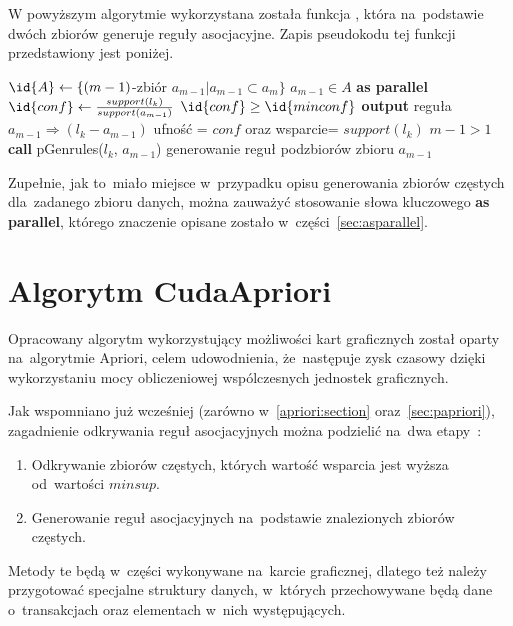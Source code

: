 W powyższym algorytmie wykorzystana została funkcja , która na~podstawie dwóch zbiorów generuje reguły asocjacyjne. Zapis pseudokodu tej funkcji przedstawiony jest poniżej.

\begin{codebox}
		\li $\id{A} \gets \lbrace (m-1)$-zbiór $a_{m-1} | a_{m-1} \subset a_m \rbrace$
		\li \For $a_{m-1} \in A$ \textbf{as parallel}
			\li \Do
			$\id{conf} \gets \frac{support(l_k)}{support(a_{m-1})}$
			\li \If $\id{conf} \geq \id{minconf}$
				\li \Then
						\textbf{output} reguła $a_{m-1} \Rightarrow (l_k - a_{m-1})$ \CommentSymbol ufność = $conf$ oraz wsparcie= $support(l_k)$
						\li \If $m-1 > 1$ 
							\li \Then
							\textbf{call} pGenrules($l_k$, $a_{m-1}$) \CommentSymbol generowanie reguł podzbiorów zbioru $a_{m-1}$
						\End
				\End
			\End
		\End
\end{codebox}

Zupełnie, jak to~miało miejsce w~przypadku opisu generowania zbiorów częstych dla~zadanego zbioru danych, można zauważyć stosowanie słowa kluczowego \textbf{as parallel}, którego znaczenie opisane zostało w~części~\ref{sec:asparallel}.

\section{Algorytm CudaApriori\label{sec:capriori}}

Opracowany algorytm wykorzystujący możliwości kart graficznych został oparty na~algorytmie Apriori, celem udowodnienia, że~następuje zysk czasowy dzięki wykorzystaniu mocy obliczeniowej wspólczesnych jednostek graficznych.

Jak wspomniano już wcześniej (zarówno w~\ref{apriori:section} oraz~\ref{sec:papriori}), zagadnienie odkrywania reguł asocjacyjnych można podzielić na~dwa etapy~\cite{Problem:Statement}:
\begin{enumerate}
	\item Odkrywanie zbiorów częstych, których wartość wsparcia jest wyższa od~wartości $minsup$.
	\item Generowanie reguł asocjacyjnych na~podstawie znalezionych zbiorów częstych.
\end{enumerate}

Metody te będą w~części wykonywane na~karcie graficznej, dlatego też należy przygotować specjalne struktury danych, w~których przechowywane będą dane o~transakcjach oraz elementach w~nich występujących.

